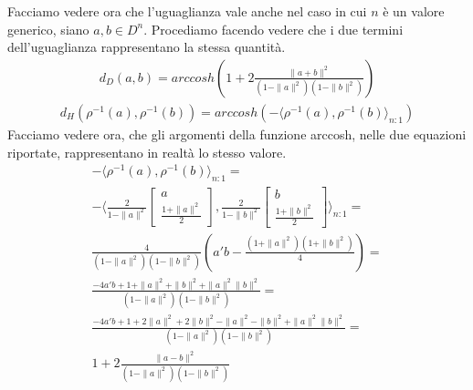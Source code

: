 \documentclass[a4paper, 12pt]{article}
\begin{document}
\\\\
Facciamo vedere ora che l'uguaglianza vale anche nel caso in cui $n$ è un valore generico, siano $a, b \in D^n$. Procediamo facendo vedere che i due termini dell'uguaglianza rappresentano la stessa quantità.\\
\begin{equation*}\begin{gathered}
d_{D}(a,b) = arccosh(1 + 2\frac{\parallel a + b \parallel^2}{(1 - \parallel a \parallel^2)(1 - \parallel b \parallel^2)})
\end{gathered}\end{equation*}
\begin{equation*}\begin{gathered}
d_{H}(\rho^{-1}(a),\rho^{-1}(b)) = arccosh(- \langle \rho^{-1}(a),\rho^{-1}(b) \rangle_{n:1})
\end{gathered}\end{equation*}
Facciamo vedere ora, che gli argomenti della funzione arccosh, nelle due equazioni riportate, rappresentano in realtà lo stesso valore.
\begin{equation*}\begin{gathered}
- \langle \rho^{-1}(a),\rho^{-1}(b) \rangle_{n:1} = \\
- \langle \frac{2}{1 - \parallel a \parallel^2} \begin{bmatrix} a \\ \frac{1 + \parallel a \parallel^2}{2} \end{bmatrix}, \frac{2}{1 - \parallel b \parallel^2} \begin{bmatrix} b \\ \frac{1 + \parallel b \parallel^2}{2} \end{bmatrix} \rangle_{n:1} = \\
\frac{4}{(1 - \parallel a \parallel^2)(1 - \parallel b \parallel^2)} \left( a'b - \frac{(1 + \parallel a \parallel^2)(1 + \parallel b \parallel^2)}{4} \right) = \\
\frac{-4a'b + 1 + \parallel a \parallel^2 + \parallel b \parallel^2 + \parallel a \parallel^2 \parallel b \parallel^2}{(1 - \parallel a \parallel^2)(1 - \parallel b \parallel^2)} = \\
\frac{-4a'b + 1 + 2\parallel a \parallel^2 + 2\parallel b \parallel^2 - \parallel a \parallel^2 - \parallel b \parallel^2 + \parallel a \parallel^2 \parallel b \parallel^2}{(1 - \parallel a \parallel^2)(1 - \parallel b \parallel^2)} = \\
1 + 2 \frac{\parallel a - b \parallel^2}{(1 - \parallel a \parallel^2)(1 - \parallel b \parallel^2)}
\end{gathered}\end{equation*}
\end{document}
